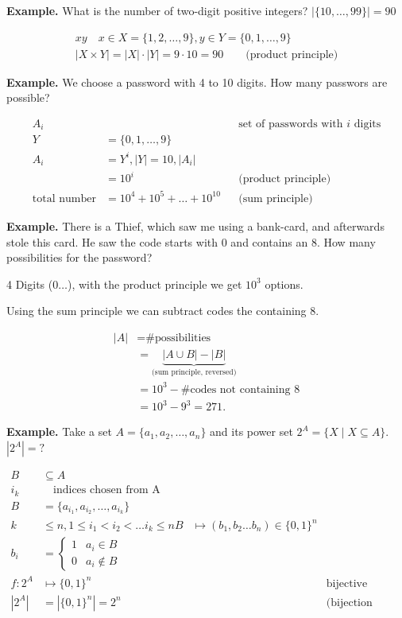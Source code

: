 \textbf{Example.}
What is the number of two-digit positive integers?
$|\{10,\ldots,99\}| = 90$

\begin{gather*}
xy\quad x\in X=\{1,2,\ldots ,9\}, y\in Y = \{0,1,\ldots ,9\} \\
|X\times Y| = |X| \cdot |Y| = 9\cdot 10 = 90
    \qquad\text{(product principle)}
\end{gather*}

\textbf{Example.}
We choose a password with 4 to 10 digits. How many passwors are possible?

\begin{align*}
    A_i &&& \text{set of passwords with $i$ digits} \\
    Y &= \{0,1,\ldots ,9\} \\
    A_i &= Y^i, |Y| = 10, |A_i| \\
    &= {10}^i  && \text{(product principle)} \\
    \text{total number} &= 10^4 + 10^5 + \ldots + 10^10 && \text{(sum principle)}
\end{align*}

\textbf{Example.}
There is a Thief, which saw me using a bank-card, and afterwards stole this card. He saw the code starts with $0$ and contains an $8$. How many possibilities for the password?

4 Digits ($0 \ldots$), with the product principle we get $10^3$ options. 

Using the sum principle we can subtract codes the containing $8$.

\begin{align*}
|A| &= \text{\# possibilities} \\
	&= \underbrace{|A\cup B| - |B|}_{\text{(sum principle, reversed)}} \\
    &= {10}^3 - \text{\# codes not containing 8} \\
    &= {10}^3 - 9^3 = 271.
\end{align*}

\textbf{Example.}
Take a set $A = \{a_1, a_2, \ldots , a_n\}$ and its power set $2^A = \{X \mid X
\subseteq A\}$. $|2^A| = ?$

\begin{align*}
    B &\subseteq A \\
    i_k &\quad\text{indices chosen from A} \\
    B &=\{a_{i_1}, a_{i_2},\ldots, a_{i_k}\} \\
    k &\leq n, 1 \leq i_1 < i_2 < \ldots i_k \leq n
        B &\mapsto
        (b_1, b_2 \ldots  b_n) \in \{0,1\}^n \\
    b_i &=
    \begin{cases}
        1 & a_i\in B \\
        0 & a_i\not\in B
    \end{cases} \\
    f: 2^A &\mapsto \{0,1\}^n &&\text{bijective mapping} \\
    |2^A| &= |\{0, 1\}^n| = 2^n
        &&\text{(bijection principle)} \\
\end{align*}

